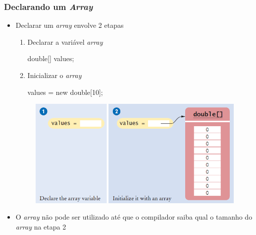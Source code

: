 \documentclass[xcolor={dvipsnames,table},aspectratio=169]{beamer}
\begin{document}
\begin{frame}[fragile]\frametitle{Declarando um \emph{Array}}
\begin{itemize}
	\item Declarar um \emph{array} envolve 2 etapas 
	\begin{enumerate}
		\item Declarar a variável \emph{array}
{\footnotesize
\begin{javacode}
double[] values;
\end{javacode}
}
		\item Inicializar o \emph{array}
{\footnotesize
\begin{javacode}
values = new double[10];
\end{javacode}
}
	\end{enumerate}
\begin{figure}[h]
	\includegraphics[height=0.25\paperheight,center]{pucrs-ep-fprog-unidade_06-arrays-laminas-declaracao_e_criacao.png}
\end{figure}
	\item O \emph{array} não pode ser utilizado até que o compilador saiba qual o tamanho do \emph{array} na etapa 2
\end{itemize}
\end{frame}
\end{document}
